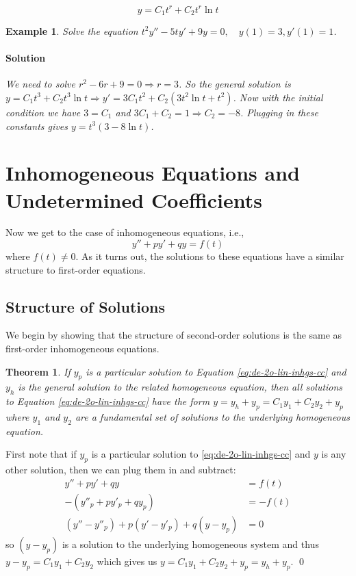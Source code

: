 \documentclass[letterpaper, 11pt, openany]{book}
\theoremstyle{mytheoremstyle}
\newtheorem{theorem}{Theorem}[section]
\renewenvironment{proof}{{\par \sffamily \smaller \fontseries{b}\selectfont Proof}}{\hfill\qed}
\theoremstyle{myexamplestyle}
\newtheorem{example}{Example}[section]
\newenvironment{solution}{\paragraph{\sffamily \smaller \fontseries{b}\selectfont Solution}}{\hfill\faSquare}
\begin{document}
\[y = C_1 t^{r} + C_2 t^{r} \ln t\]

\begin{example}
    Solve the equation \(t^2 y'' - 5t y' + 9y = 0, \quad y(1) = 3, y'(1) = 1\).
    \begin{solution}
        We need to solve \(r^2 - 6r + 9 = 0 \Rightarrow r = 3\). So the general solution is \(y = C_{1} t^3 + C_{2}t^3 \ln t \Rightarrow y' = 3C_{1} t^{2} + C_{2}\left( 3t^2  \ln t + t^2\right)\). Now with the initial condition we have \(3 = C_{1}\) and \(3C_{1} + C_{2} = 1 \Rightarrow C_{2} = -8\). Plugging in these constants gives \(y = t^{3} \left( 3- 8 \ln t \right)\).
    \end{solution}
\end{example}

\section{Inhomogeneous Equations and Undetermined Coefficients}
\setcounter{figure}{0}
Now we get to the case of inhomogeneous equations, i.e., 
\begin{equation}\label{eq:de-2o-lin-inhgs-cc}
    y'' + py' + qy = f(t)
\end{equation}
where \(f(t) \neq 0\). As it turns out, the solutions to these equations have a similar structure to first-order equations.

\subsection{Structure of Solutions}

We begin by showing that the structure of second-order solutions is the same as first-order inhomogeneous equations.

\begin{theorem}\label{t:de-inhgs-gen-struct}
    If \(y_{p}\) is a particular solution to Equation \eqref{eq:de-2o-lin-inhgs-cc} and \(y_{h}\) is the general solution to the related homogeneous equation, then all solutions to Equation \eqref{eq:de-2o-lin-inhgs-cc} have the form \(y = y_{h} + y_{p} = C_{1} y_{1} + C_{2} y_{2} + y_{p}\) where \(y_{1}\) and \(y_{2}\) are a fundamental set of solutions to the underlying homogeneous equation.
\end{theorem}

\begin{proof}
    First note that if \(y_{p}\) is a particular solution to \eqref{eq:de-2o-lin-inhgs-cc} and \(y\) is any other solution, then we can plug them in and subtract:
\begin{align*}
    y'' + py' + qy &= f(t)\\
    -(y''_{p} + py'_{p} + qy_{p}) &= -f(t)\\
   (y'' - y''_{p}) + p(y' - y'_{p}) + q(y - y_{p}) &= 0
\end{align*}
so \((y - y_{p})\) is a solution to the underlying homogeneous system and thus \(y - y_{p} = C_{1} y_{1} + C_{2} y_{2}\) which gives us \(y  = C_{1} y_{1} + C_{2} y_{2} + y_{p}= y_{h} + y_{p}\).
\end{proof}
\end{document}
